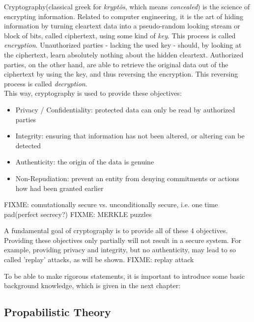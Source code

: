 

Cryptography(classical greek for \textit{krypt\^{o}s}, which means \textit{concealed})
is the science of encrypting information.
Related to computer engineering, it is the art of hiding information by turning cleartext
data into a 
pseudo-random looking stream or block of bits, called ciphertext, using some kind of
\textit{key}. This process is called \textit{encryption}.
Unauthorized parties - lacking the used key - should, by looking at the ciphertext, learn
absolutely nothing about the hidden cleartext. Authorized parties, on the other hand, are
able to retrieve the original data out of the ciphertext by using the key, and thus reversing
the encryption. This reversing process is called \textit{decryption}.
\\

This way, cryptography is used to provide these objectives:

\begin{itemize}
 \item Privacy / Confidentiality: protected data can only be read by authorized parties
 \item Integrity: ensuring that information has not been altered, or altering can be detected
 \item Authenticity: the origin of the data is genuine
 \item Non-Repudiation: prevent an entity from denying commitments or actions how had been 
 granted earlier
\end{itemize}

FIXME: comutationally secure vs. unconditionally secure, i.e. one time pad(perfect secrecy?)
FIXME: MERKLE puzzles

A fundamental goal of cryptography is to provide all of these 4 objectives. Providing these
objectives only partially will not result in a secure system. For example, providing privacy and
integrity, but no authenticity, may lead to so called 'replay' attacks, as will be shown.
FIXME: replay attack

To be able to make rigorous statements, it is important to introduce some basic background knowledge, which
is given in the next chapter:

\subsection{Propabilistic Theory}

